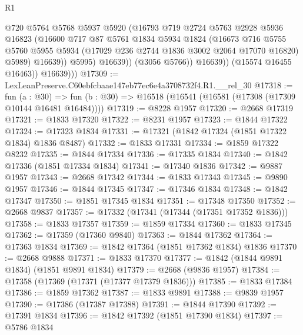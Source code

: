 \begin{lexlean}{R1}
\begin{coremodule}
                        @720
                        @5764
                        @5768
                        @5937
                        @5920
                        (@16793
                          @719
                          @2724
                          @5763
                          @2928
                          @5936
                          @16823
                          (@16600
                            @717
                            @87
                            @5761
                            @1834
                            @5934
                            @1824
                            (@16673
                              @716
                              @5755
                              @5760
                              @5955
                              @5934
                              (@17029 @236 @2744 @1836 @3002 @2064 @17070 @16820)
                              @5989)
                            @16639))
                        @5995)
                      @16639))
                  (@3056 @5766))
                @16639))
            (@15574 @16455 @16463))
          @16639)))
@17309 := LexLeanPreserve.C60ebfcbaae147eb77ec6e4a3708732f4.R1.__rel_30
@17318 := fun (a : @30) =>
  fun (b : @30) => @16518 (@16541 (@16581 (@17308 (@17309 @10144 @16481 @16484))))
@17319 := @8228 @1957
@17320 := @2668 @17319
@17321 := @1833 @17320
@17322 := @8231 @1957
@17323 := @1844 @17322
@17324 := @17323 @1834
@17331 := @17321 (@1842 @17324 (@1851 @17322 @1834) @1836 @8487)
@17332 := @1833 @17331
@17334 := @1859 @17322 @8232
@17335 := @1844 @17334
@17336 := @17335 @1834
@17340 := @1842 @17336 (@1851 @17334 @1834)
@17341 := @17340 @1836
@17342 := @9887 @1957
@17343 := @2668 @17342
@17344 := @1833 @17343
@17345 := @9890 @1957
@17346 := @1844 @17345
@17347 := @17346 @1834
@17348 := @1842 @17347
@17350 := @1851 @17345 @1834
@17351 := @17348 @17350
@17352 := @2668 @9837
@17357 := @17332 (@17341 (@17344 (@17351 @17352 @1836)))
@17358 := @1833 @17357
@17359 := @1859 @17334
@17360 := @1833 @17345
@17362 := @17359 (@17360 @9840)
@17363 := @1844 @17362
@17364 := @17363 @1834
@17369 := @1842 @17364 (@1851 @17362 @1834) @1836
@17370 := @2668 @9888
@17371 := @1833 @17370
@17377 := @1842 (@1844 @9891 @1834) (@1851 @9891 @1834)
@17379 := @2668 (@9836 @1957)
@17384 := @17358 (@17369 (@17371 (@17377 @17379 @1836)))
@17385 := @1833 @17384
@17386 := @1859 @17362
@17387 := @1833 @9891
@17388 := @9839 @1957
@17390 := @17386 (@17387 @17388)
@17391 := @1844 @17390
@17392 := @17391 @1834
@17396 := @1842 @17392 (@1851 @17390 @1834)
@17397 := @5786 @1834

\end{coremodule}
\end{lexlean}
